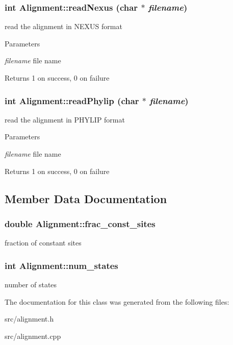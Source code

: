 \hypertarget{classAlignment_a50c61ad1efb041f9e0039d5293646b15}{
\subsubsection[{readNexus}]{\setlength{\rightskip}{0pt plus 5cm}int Alignment::readNexus (char $\ast$ {\em filename})}}
\label{classAlignment_a50c61ad1efb041f9e0039d5293646b15}
read the alignment in NEXUS format 
\begin{DoxyParams}{Parameters}
\item[{\em filename}]file name \end{DoxyParams}
\begin{DoxyReturn}{Returns}
1 on success, 0 on failure 
\end{DoxyReturn}
\hypertarget{classAlignment_a5d924570d1b019b734c9d30f35d1dd2e}{
\subsubsection[{readPhylip}]{\setlength{\rightskip}{0pt plus 5cm}int Alignment::readPhylip (char $\ast$ {\em filename})}}
\label{classAlignment_a5d924570d1b019b734c9d30f35d1dd2e}
read the alignment in PHYLIP format 
\begin{DoxyParams}{Parameters}
\item[{\em filename}]file name \end{DoxyParams}
\begin{DoxyReturn}{Returns}
1 on success, 0 on failure 
\end{DoxyReturn}


\subsection{Member Data Documentation}
\hypertarget{classAlignment_a85715ac791c22f38ca74dc60198d5f23}{
\subsubsection[{frac\_\-const\_\-sites}]{\setlength{\rightskip}{0pt plus 5cm}double {\bf Alignment::frac\_\-const\_\-sites}}}
\label{classAlignment_a85715ac791c22f38ca74dc60198d5f23}
fraction of constant sites \hypertarget{classAlignment_aef8af61d49ceedd23bbec2c9f8a3adef}{
\subsubsection[{num\_\-states}]{\setlength{\rightskip}{0pt plus 5cm}int {\bf Alignment::num\_\-states}}}
\label{classAlignment_aef8af61d49ceedd23bbec2c9f8a3adef}
number of states 

The documentation for this class was generated from the following files:\begin{DoxyCompactItemize}
\item 
src/alignment.h\item 
src/alignment.cpp\end{DoxyCompactItemize}
